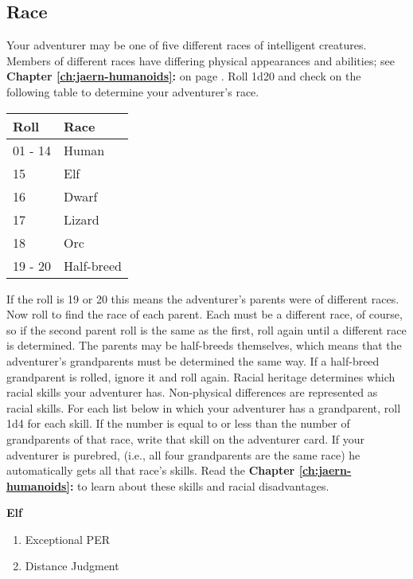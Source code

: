 \begin{multicols*}{2}
\section{Race}
Your adventurer may be one of five different races of intelligent creatures. Members of different races have differing physical appearances and abilities; see \textbf{Chapter \ref{ch:jaern-humanoids}: } on page \textbf{\pageref{jaern-races}}. Roll 1d20 and check on the following table to determine your adventurer’s race.
\begin{tcolorbox}[boxrule=0pt]
\begin{tabular}{l l}
Roll & Race\\
\midrule
01 - 14 & Human\\
15 & Elf\\
16 & Dwarf \\
17 & Lizard\\
18 & Orc\\
19 - 20 & Half-breed\\
\end{tabular}
\end{tcolorbox}
If the roll is 19 or 20 this means the adventurer’s parents were of different races. Now roll to find the race of each parent. Each must be a different race, of course, so if the second parent roll is the same as the first, roll again until a different race is determined. The parents may be half-breeds themselves, which means that the adventurer’s grandparents must be determined the same way. If a half-breed grandparent is rolled, ignore it and roll again. Racial heritage determines which racial skills your adventurer has. Non-physical differences are represented as racial skills. For each list below in which your adventurer has a grandparent, roll 1d4 for each skill. If the number is equal to or less than the number of grandparents of that race, write that skill on the adventurer card. If your adventurer is purebred, (i.e., all four grandparents are the same race) he automatically gets all that race's skills. Read the \textbf{Chapter \ref{ch:jaern-humanoids}: } to learn about these skills and racial disadvantages.
\setlength{\columnsep}{0.05cm}
\begin{multicols}{2}
\begin{tcolorbox}[breakable,boxrule=0pt,after skip=0pt]
\textbf{Elf}
\begin{enumerate}[leftmargin=0.1cm]
\item Exceptional PER
\item Distance Judgment

\end{enumerate}
\end{tcolorbox}
\end{multicols}
\end{multicols*}
